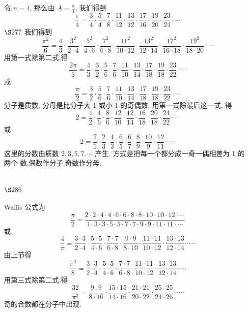 令 $n=1$, 那么由 $A=\frac{\pi}{4}$, 我们得到
\[
\frac{\pi}{4}=\frac{3}{4} \cdot \frac{5}{4} \cdot \frac{7}{8} \cdot \frac{11}{12} \cdot \frac{13}{12} \cdot \frac{17}{16} \cdot \frac{19}{20} \cdot \frac{23}{24} \cdot \cdots
\]
$\S 277$ 我们得到
\[
\frac{\pi^{2}}{6}=\frac{4}{3} \cdot \frac{3^{2}}{2 \cdot 4} \cdot \frac{5^{2}}{4 \cdot 6} \cdot \frac{7^{2}}{6 \cdot 8} \cdot \frac{11^{2}}{10 \cdot 12} \cdot \frac{13^{2}}{12 \cdot 14} \cdot \frac{17^{2}}{16 \cdot 18} \cdot \frac{19^{2}}{18 \cdot 20} \cdot \cdots
\]
用第一式除第二式,得
\[
\frac{2 \pi}{3}=\frac{4}{3} \cdot \frac{3}{2} \cdot \frac{5}{6} \cdot \frac{7}{6} \cdot \frac{11}{10} \cdot \frac{13}{14} \cdot \frac{17}{18} \cdot \frac{19}{18} \cdot \frac{23}{22} \cdot \cdots
\]
或
\[
\frac{\pi}{2}=\frac{3}{2} \cdot \frac{5}{6} \cdot \frac{7}{6} \cdot \frac{11}{10} \cdot \frac{13}{14} \cdot \frac{17}{18} \cdot \frac{19}{18} \cdot \frac{23}{22} \cdot \cdots
\]
分子是质数, 分母是比分子大 1 或小 1 的奇偶数. 用第一式除最后这一式, 得
\[
2=\frac{4}{2} \cdot \frac{4}{6} \cdot \frac{8}{6} \cdot \frac{12}{10} \cdot \frac{12}{14} \cdot \frac{16}{18} \cdot \frac{20}{18} \cdot \frac{24}{22} \cdot \cdots
\]
或
\[
2=\frac{2}{1} \cdot \frac{2}{3} \cdot \frac{4}{3} \cdot \frac{6}{5} \cdot \frac{6}{7} \cdot \frac{8}{9} \cdot \frac{10}{9} \cdot \frac{12}{11} \cdots \cdots
\]
这里的分数由质数 $2,3,5,7, \cdots$ 产生, 方式是把每一个都分成一奇一偶相差为 1 的两个 数,偶数作分子,奇数作分母.

\section{$\S 286$}

Wallis 公式为
\[
\frac{\pi}{2}=\frac{2 \cdot 2 \cdot 4 \cdot 4 \cdot 6 \cdot 6 \cdot 8 \cdot 8 \cdot 10 \cdot 10 \cdot 12 \cdot \cdots}{1 \cdot 3 \cdot 3 \cdot 5 \cdot 5 \cdot 7 \cdot 7 \cdot 9 \cdot 9 \cdot 11 \cdot 11 \cdot \cdots}
\]
或
\[
\frac{4}{\pi}=\frac{3 \cdot 3}{2 \cdot 4} \cdot \frac{5 \cdot 5}{4 \cdot 6} \cdot \frac{7 \cdot 7}{6 \cdot 8} \cdot \frac{9 \cdot 9}{8 \cdot 10} \cdot \frac{11 \cdot 11}{10 \cdot 12} \cdot \frac{13 \cdot 13}{12 \cdot 14} \cdots \cdots
\]
由上节得
\[
\frac{\pi^{2}}{8}=\frac{3 \cdot 3}{2 \cdot 4} \cdot \frac{5 \cdot 5}{4 \cdot 6} \cdot \frac{7 \cdot 7}{6 \cdot 8} \cdot \frac{11 \cdot 11}{10 \cdot 12} \cdot \frac{13 \cdot 13}{12 \cdot 14} \cdot \cdots
\]
用第三式除第二式,得
\[
\frac{32}{\pi^{3}}=\frac{9 \cdot 9}{8 \cdot 10} \cdot \frac{15 \cdot 15}{14 \cdot 16} \cdot \frac{21 \cdot 21}{20 \cdot 22} \cdot \frac{25 \cdot 25}{24 \cdot 26} \cdots \cdots
\]
奇的合数都在分子中出现.

